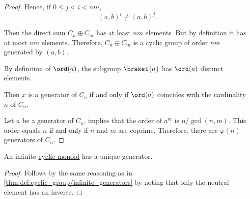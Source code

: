 \begin{proof}
  Hence, if \( 0 \leq j < i < nm \),
  \begin{equation*}
    (a, b)^i \neq (a, b)^j.
  \end{equation*}

  Then the direct sum \( C_n \oplus C_m \) has at least \( nm \) elements. But by definition it has at most \( nm \) elements. Therefore, \( C_n \oplus C_m \) is a cyclic group of order \( nm \) generated by \( (a, b) \).

   By definition of \( \ord(a) \), the subgroup \( \braket{ a } \) has \( \ord(a) \) distinct elements.

  Then \( x \) is a generator of \( C_n \) if and only if \( \ord(a) \) coincides with the cardinality \( n \) of \( C_n \).

   Let \( a \) be a generator of \( C_n \).  implies that the order of \( a^m \) is \( n / \gcd(n, m) \). This order equals \( n \) if and only if \( n \) and \( m \) are coprime. Therefore, there are \( \varphi(n) \) generators of \( C_n \).
\end{proof}

\begin{corollary}\label{thm:infinite_cyclic_monoid_generator}
  An infinite \hyperref[def:cyclic_monoid]{cyclic monoid} has a unique generator.
\end{corollary}
\begin{proof}
  Follows by the same reasoning as in \cref{thm:def:cyclic_group/infinite_generators} by noting that only the neutral element has an inverse.
\end{proof}
